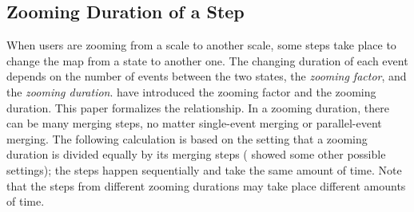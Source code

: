 \documentclass[ijgi,article,submit,moreauthors,pdftex]{Definitions/mdpi}
\begin{document}



\subsection{Zooming Duration of a Step}
\label{sec:zooming_duration}

When users are zooming from a scale to another scale,
some steps take place to change the map from a state to another one.
The changing duration of each event 
depends on the number of events between the two states,
the \emph{zooming factor}, and the \emph{zooming duration}.
\citet[][]{Meijers2020Web} 
have introduced the zooming factor and the zooming duration.
This paper formalizes the relationship.
In a zooming duration, there can be many merging steps,
no matter single-event merging or parallel-event merging.
The following calculation is based on the setting that
a zooming duration is divided equally by its merging steps
(\citet[][]{Suba2017Thesis} showed some other possible settings);
the steps happen sequentially and take the same amount of time.
Note that the steps from different zooming durations may take place different
amounts of time.
\end{document}
